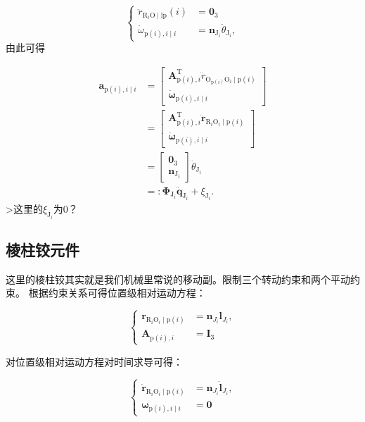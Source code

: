 \[
\left\{\begin{aligned}
\ddot{r}_{\mathrm{R}_{i} \mathrm{O}\mid \mathrm{lp}} (i) & =\mathbf{0}_{3} \\
\dot{\omega}_{\mathrm{p}(i), i \mid i} & =\boldsymbol{n}_{\mathrm{J}_{i}} \ddot{\theta}_{\mathrm{J}_{i}},
\end{aligned}\right.
\]
由此可得

\[
\begin{aligned}
\boldsymbol{a}_{\mathrm{p}(i), i \mid i} & =\left[\begin{array}{c}
\boldsymbol{A}_{\mathrm{p}(i), i}^{\mathrm{T}} \ddot{r}_{\mathrm{O}_{\mathrm{p}(i)} \mathrm{O}_{i} \mid \mathrm{p}(i)} \\
\dot{\boldsymbol{\omega}}_{\mathrm{p}(i), i \mid i}
\end{array}\right] \\
& =\left[\begin{array}{c}
\boldsymbol{A}_{\mathrm{p}(i), i}^{\mathrm{T}} \ddot{\boldsymbol{r}}_{\mathrm{R}_{i} \mathrm{O}_{i} \mid \mathrm{p}(i)} \\
\dot{\boldsymbol{\omega}}_{\mathrm{p}(i), i \mid i}
\end{array}\right] \\
& =\left[\begin{array}{c}
\mathbf{0}_{3} \\
\boldsymbol{n}_{\mathrm{J}_{i}}
\end{array}\right] \ddot{\theta}_{\mathrm{J}_{i}} \\
& =: \boldsymbol{\Phi}_{\mathrm{J}_{i}} \ddot{\boldsymbol{q}}_{\mathrm{J}_{i}}+\xi_{\mathrm{J}_{i}} .
\end{aligned}
\]
>这里的$\xi_{\mathrm{J}_{i}}$为0？
\subsection{棱柱铰元件}
这里的棱柱铰其实就是我们机械里常说的移动副。限制三个转动约束和两个平动约束。
根据约束关系可得位置级相对运动方程：

\[
\left\{\begin{aligned}
\boldsymbol{r}_{\mathrm{R}_{i} \mathrm{O}_{i} \mid \mathrm{p}(i)} & =\boldsymbol{n}_{J_{i}}\boldsymbol{l}_{J_{i}}, \\
\boldsymbol{A}_{\mathrm{p}(i), i} & =\boldsymbol{I}_{3} 
\end{aligned}\right.
\]

对位置级相对运动方程对时间求导可得：

\[
\left\{\begin{aligned}
\dot{\boldsymbol{r}}_{\mathrm{R}_{i} \mathrm{O}_{i} \mid \mathrm{p}(i)} & =\boldsymbol{n}_{J_{i}}\dot{\boldsymbol{l}}_{J_{i}}, \\
\boldsymbol{\omega}_{\mathrm{p}(i), i \mid i} & =\boldsymbol{0}
\end{aligned}\right.
\]

